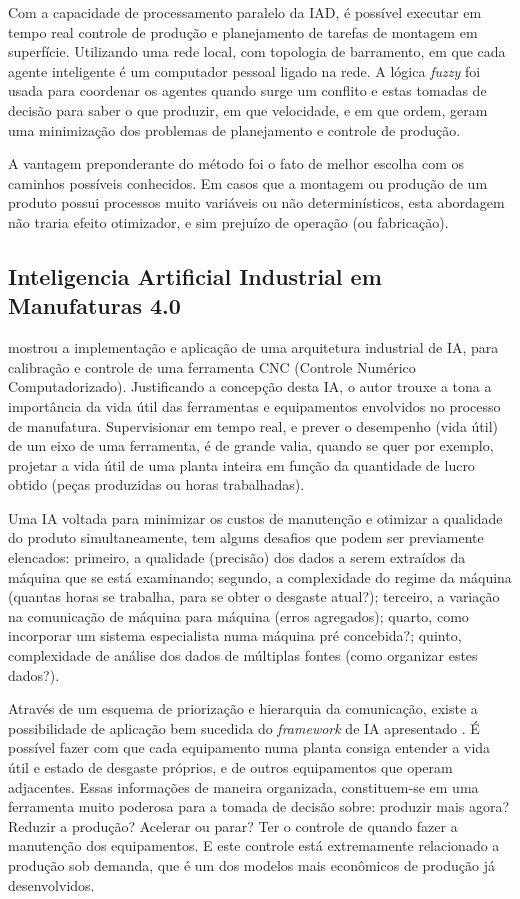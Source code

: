\documentclass[
	article,			    %
	12pt,				    %
	oneside,			    %
	a4paper,			    %
	chapter=TITLE,		    %
	section=TITLE,		    %
	subsection=TITLE,	    %
	english,			    %
	brazil,				    %
	sumario=tradicional
]{abntex2}
\begin{document}
Com a capacidade de processamento paralelo da IAD, é possível executar em tempo real controle de produção e planejamento de tarefas de montagem em superfície. Utilizando uma rede local, com topologia de barramento, em que cada agente inteligente é um computador pessoal ligado na rede. A lógica \emph{fuzzy} foi usada para coordenar os agentes quando surge um conflito e estas tomadas de decisão para saber o que produzir, em que velocidade, e em que ordem, geram uma minimização dos problemas de planejamento e controle de produção.

A vantagem preponderante do método foi o fato de melhor escolha com os caminhos possíveis conhecidos. Em casos que a montagem ou produção de um produto possui processos muito variáveis ou não determinísticos, esta abordagem não traria efeito otimizador, e sim prejuízo de operação (ou fabricação).

\subsection{Inteligencia Artificial Industrial em Manufaturas 4.0}
 mostrou a implementação e aplicação de uma arquitetura industrial de IA, para calibração e controle de uma ferramenta CNC (Controle Numérico Computadorizado). Justificando a concepção desta IA, o autor trouxe a tona a importância da vida útil das ferramentas e equipamentos envolvidos no processo de manufatura. Supervisionar em tempo real, e prever o desempenho (vida útil) de um eixo de uma ferramenta, é de grande valia, quando se quer por exemplo, projetar a vida útil de uma planta inteira em função da quantidade de lucro obtido (peças produzidas ou horas trabalhadas).

Uma IA voltada para minimizar os custos de manutenção e otimizar a qualidade do produto simultaneamente, tem alguns desafios que podem ser previamente elencados: primeiro, a qualidade (precisão) dos dados a serem extraídos da máquina que se está examinando; segundo, a complexidade do regime da máquina (quantas horas se trabalha, para se obter o desgaste atual?); terceiro, a variação na comunicação de máquina para máquina (erros agregados); quarto, como incorporar um sistema especialista numa máquina pré concebida?; quinto, complexidade de análise dos dados de múltiplas fontes (como organizar estes dados?).

Através de um esquema de priorização e hierarquia da comunicação, existe a possibilidade de aplicação bem sucedida do \emph{framework} de IA apresentado \cite{leejay4.0manufacturing}. É possível fazer com que cada equipamento numa planta consiga entender a vida útil e estado de desgaste próprios, e de outros equipamentos que operam adjacentes. Essas informações de maneira organizada, constituem-se em uma ferramenta muito poderosa para a tomada de decisão sobre: produzir mais agora? Reduzir a produção? Acelerar ou parar? Ter o controle de quando fazer a manutenção dos equipamentos. E este controle está extremamente relacionado a produção sob demanda, que é um dos modelos mais econômicos de produção já desenvolvidos.
\end{document}
